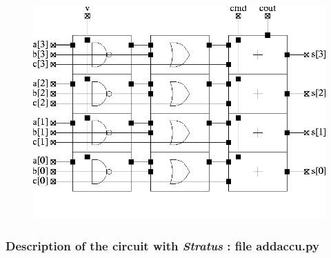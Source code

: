 \begin{figure}[h!]
\centering
{}
          {\includegraphics[width=.9\textwidth]{./images/add2.png}}
\end{figure}

\newpage
\subsubsection{Description of the circuit with \emph{Stratus} : file addaccu.py}


